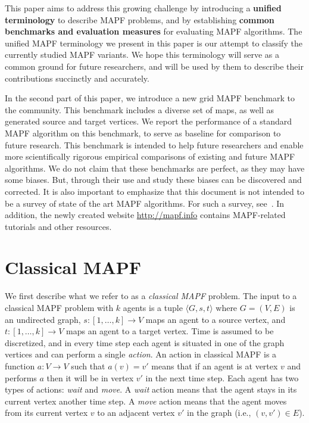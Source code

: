 \documentclass[letterpaper]{article} %
\newcommand{\mapf}{\ac{MAPF}\xspace}
\newcommand{\comment}[1]{{\nb{\textbf{Comment:}}{orange}{#1}}}
\begin{document}
This paper aims to address this growing challenge by introducing  a \textbf{unified terminology} to describe \mapf problems, and by establishing \textbf{common benchmarks and evaluation measures} for evaluating \mapf algorithms. 
The unified \mapf terminology we present in this paper is our attempt to classify the currently studied  \mapf variants. We hope this terminology will serve as a common ground for future researchers, and will be used by them to describe their contributions succinctly and accurately. %

In the second part of this paper, we introduce a new grid \mapf benchmark to the community. This benchmark includes a diverse set of maps, as well as generated source and target vertices. We report the performance of a standard \mapf algorithm on this benchmark, to serve as baseline for comparison to future research. This benchmark is intended to help future researchers and enable more scientifically rigorous empirical comparisons of existing and future \mapf algorithms. We do not claim that these benchmarks are perfect, as they may have some biases. But, through their use and study these biases can be discovered and corrected. It is also important to emphasize that this document is not intended to be a survey of  state of the art MAPF algorithms. For such a survey, see~\cite{felner2017search,ma2017buzz}. 
In addition, the newly created website
\url{http://mapf.info} contains \mapf-related tutorials and other resources. 




\section{Classical MAPF}
We first describe what we refer to as a \emph{classical MAPF} problem. 
The input to a classical MAPF problem with $k$ agents is 
a tuple $\langle G, s, t\rangle$ 
where $G=(V,E)$ is an undirected graph, 
$s:[1,\ldots,k]\rightarrow V$ maps an agent to a source vertex, 
and $t:[1,\ldots,k]\rightarrow V$ maps an agent to a target vertex. 
Time is assumed to be discretized, and in every time step each agent is situated in one of the graph vertices 
and can perform a single \emph{action}. 
An action in classical MAPF is a function $a: V\rightarrow V$ 
such that $a(v)=v'$ means that if an agent is at vertex $v$ and performs $a$ then it will be in vertex $v'$ in the next time step. 
Each agent has two types of actions: \emph{wait} and \emph{move}. 
A \emph{wait} action means that the agent stays in its current vertex another time step. 
A \emph{move} action means that the agent moves from its current vertex $v$ to an adjacent vertex $v'$ in the graph (i.e., $(v,v')\in E$). 
\end{document}
